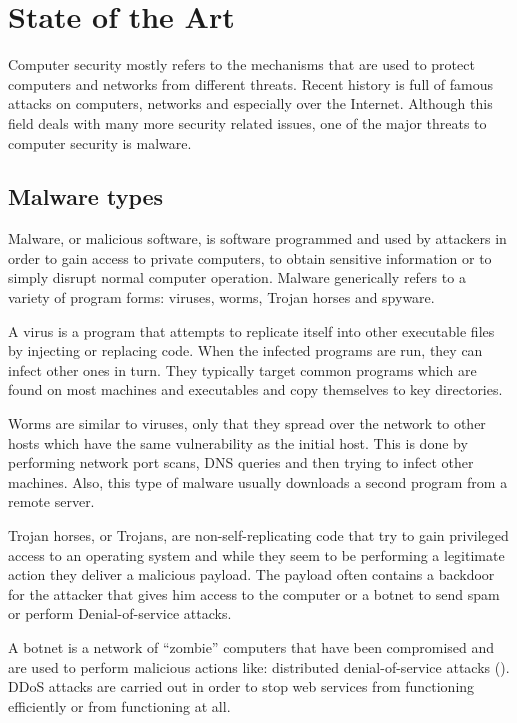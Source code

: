 \chapter{State of the Art}
\label{chapter:second-chapter}

Computer security mostly refers to the mechanisms that are used to protect computers and networks from different threats. Recent history is full of famous attacks on computers, networks and especially over the Internet. Although this field deals with many more security related issues, one of the major threats to computer security is malware.

\section{Malware types}
\label{sec:mal-types}

Malware, or malicious software, is software programmed and used by attackers in order to gain access to private computers, to obtain sensitive information or to simply disrupt normal computer operation. Malware generically refers to a variety of program forms: viruses, worms, Trojan horses and spyware.

A virus is a program that attempts to replicate itself into other executable files by injecting or replacing code. When the infected programs are run, they can infect other ones in turn. They typically target common programs which are found on most machines and executables and copy themselves to key directories.

Worms are similar to viruses, only that they spread over the network to other hosts which have the same vulnerability as the initial host. This is done by performing network port scans, DNS queries and then trying to infect other machines. Also, this type of malware usually downloads a second program from a remote server.

Trojan horses, or Trojans, are non-self-replicating code that try to gain privileged access to an operating system and while they seem to be performing a legitimate action they deliver a malicious payload. The payload often contains a backdoor for the attacker that gives him access to the computer or a botnet to send spam or perform Denial-of-service attacks.

A botnet is a network of ``zombie'' computers that have been compromised and are used to perform malicious actions like: distributed denial-of-service attacks (). DDoS attacks are carried out in order to stop web services from functioning efficiently or from functioning at all.

